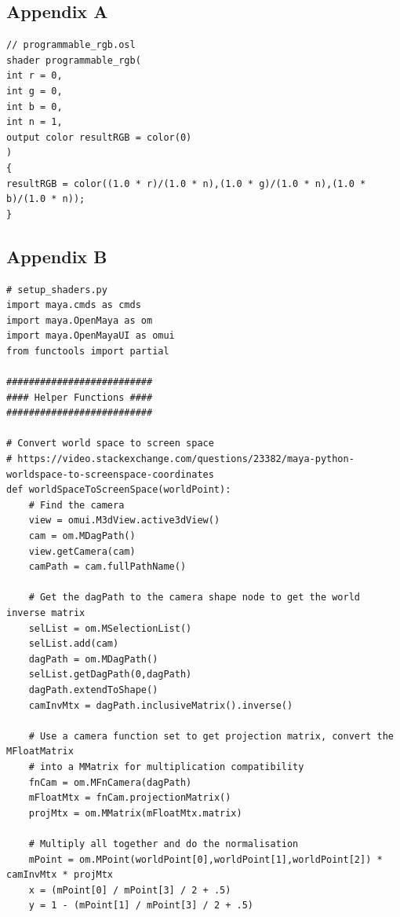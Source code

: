 \documentclass[conference]{IEEEtran}
\begin{document}
\begin{center}
\section*{Appendix A}
\label{app:a}
\end{center}

\footnotesize{
\begin{verbatim}
// programmable_rgb.osl
shader programmable_rgb(
int r = 0,
int g = 0,
int b = 0,
int n = 1,
output color resultRGB = color(0)
)
{
resultRGB = color((1.0 * r)/(1.0 * n),(1.0 * g)/(1.0 * n),(1.0 * b)/(1.0 * n));
}
\end{verbatim}

\bigskip

\begin{center}
\section*{Appendix B}
\label{app:b}
\end{center}

\footnotesize{
\begin{verbatim}
# setup_shaders.py
import maya.cmds as cmds
import maya.OpenMaya as om
import maya.OpenMayaUI as omui
from functools import partial

##########################
#### Helper Functions ####
##########################

# Convert world space to screen space
# https://video.stackexchange.com/questions/23382/maya-python-worldspace-to-screenspace-coordinates
def worldSpaceToScreenSpace(worldPoint):
    # Find the camera
    view = omui.M3dView.active3dView()
    cam = om.MDagPath()
    view.getCamera(cam)
    camPath = cam.fullPathName()
    
    # Get the dagPath to the camera shape node to get the world inverse matrix
    selList = om.MSelectionList()
    selList.add(cam)
    dagPath = om.MDagPath()
    selList.getDagPath(0,dagPath)
    dagPath.extendToShape()
    camInvMtx = dagPath.inclusiveMatrix().inverse()

    # Use a camera function set to get projection matrix, convert the MFloatMatrix 
    # into a MMatrix for multiplication compatibility
    fnCam = om.MFnCamera(dagPath)
    mFloatMtx = fnCam.projectionMatrix()
    projMtx = om.MMatrix(mFloatMtx.matrix)

    # Multiply all together and do the normalisation
    mPoint = om.MPoint(worldPoint[0],worldPoint[1],worldPoint[2]) * camInvMtx * projMtx
    x = (mPoint[0] / mPoint[3] / 2 + .5)
    y = 1 - (mPoint[1] / mPoint[3] / 2 + .5)
    

\end{verbatim}}}
\end{document}
